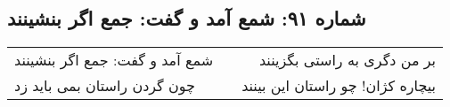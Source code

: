 \begin{center}
\section*{شماره ۹۱: شمع آمد و گفت: جمع اگر بنشینند}
\label{sec:091}
\begin{longtable}{l p{0.5cm} r}
شمع آمد و گفت: جمع اگر بنشینند
&&
بر من دگری به راستی بگزینند
\\
چون گردن راستان بمی باید زد
&&
بیچاره کژان! چو راستان این بینند
\\
\end{longtable}
\end{center}
